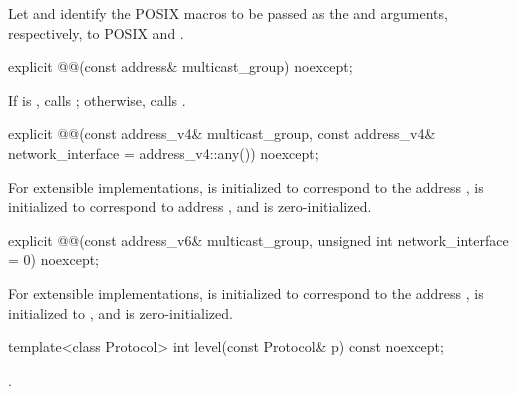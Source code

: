 \pnum
Let  and  identify the POSIX macros to be passed as the  and  arguments, respectively, to POSIX  and .

\begin{itemdecl}
explicit @@(const address& multicast_group) noexcept;
\end{itemdecl}

\begin{itemdescr}
\pnum
\effects If  is , calls ; otherwise, calls .
\end{itemdescr}

\begin{itemdecl}
explicit @@(const address_v4& multicast_group,
           const address_v4& network_interface = address_v4::any()) noexcept;
\end{itemdecl}

\begin{itemdescr}
\pnum
\effects For extensible implementations,  is initialized to correspond to the address ,  is initialized to correspond to address , and  is zero-initialized.
\end{itemdescr}

\begin{itemdecl}
explicit @@(const address_v6& multicast_group,
           unsigned int network_interface = 0) noexcept;
\end{itemdecl}

\begin{itemdescr}
\pnum
\effects For extensible implementations,  is initialized to correspond to the address ,  is initialized to , and  is zero-initialized.
\end{itemdescr}

\begin{itemdecl}
template<class Protocol> int level(const Protocol& p) const noexcept;
\end{itemdecl}

\begin{itemdescr}
\pnum
\returns {}.
\end{itemdescr}

